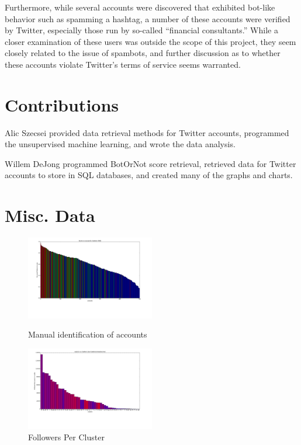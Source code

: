 \documentclass{sig-alternate-05-2015}
\begin{document}
Furthermore, while several accounts were discovered that exhibited bot-like behavior such as spamming a hashtag, a number of these accounts were verified by Twitter, especially those run by so-called ``financial consultants.'' While a closer examination of these users was outside the scope of this project, they seem closely related to the issue of spambots, and further discussion as to whether these accounts violate Twitter's terms of service seems warranted.

%

%
%

\appendix
\section{Contributions}
Alic Szecsei provided data retrieval methods for Twitter accounts, programmed the unsupervised machine learning, and wrote the data analysis.

Willem DeJong programmed BotOrNot score retrieval, retrieved data for Twitter accounts to store in SQL databases, and created many of the graphs and charts.

\section{Misc. Data}

\begin{figure}[h!]
	\caption{Manual identification of accounts}
	\centering
		\includegraphics[width=0.5\textwidth]{imgs/barvsaccnt}
	\label{fig:barvsaccnt}
\end{figure}

\begin{figure}[h!]
	\caption{Followers Per Cluster}
	\centering
		\includegraphics[width=0.5\textwidth]{imgs/followers}
\end{figure}
\end{document}
